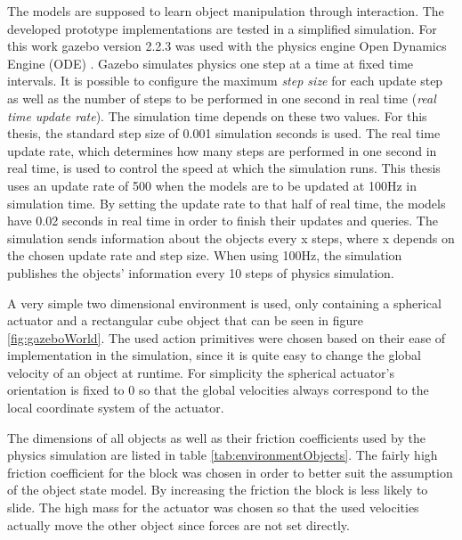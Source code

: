 The models are supposed to learn object manipulation through interaction.
The developed prototype implementations are tested in a simplified simulation. For this work gazebo \cite{gazebo} version 2.2.3 was used with the physics engine Open Dynamics Engine (ODE) \cite{ode}.
Gazebo simulates physics one step at a time at fixed time intervals. It is possible to configure the maximum \textit{step size} for each update step as well as the number of steps to be performed in one second in real time (\textit{real time update rate}). 
The simulation time depends on these two values. For this thesis, the standard step size of 0.001 simulation seconds is used. The real time update rate, which determines how many steps are performed in one second in real time, is used to control the speed at which the simulation runs. 
This thesis uses an update rate of 500 when the models are to be updated at 100Hz in simulation time. By setting the update rate to that half of real time, the models have 0.02 seconds in real time in order to finish their updates and queries. %
The simulation sends information about the objects every x steps, where x depends on the chosen update rate and step size. When using 100Hz, the simulation publishes the objects' information every 10 steps of physics simulation.

A very simple two dimensional environment is used, only containing a spherical actuator and a rectangular cube object that can be seen in figure \ref{fig:gazeboWorld}. %
The used action primitives were chosen based on their ease of implementation in the simulation, since it is quite easy to change the global velocity of an object
at runtime. For simplicity the spherical actuator's orientation is fixed to 0 so that the global velocities always correspond to the local coordinate system of the actuator.

The dimensions of all objects as well as their friction coefficients used by the physics simulation are listed in table \ref{tab:environmentObjects}.
The fairly high friction coefficient for the block was chosen in order to better suit the assumption of the object state model. By increasing the friction the block is less likely to slide. The high mass for the actuator was chosen so that the used velocities actually move the other object since forces are not set directly.

